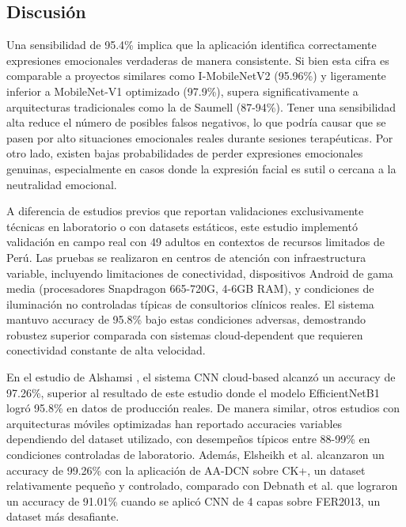 \documentclass[journal,article,submit,pdftex,moreauthors]{Definitions/mdpi}
\begin{document}
	\subsection{Discusión}
	
	Una sensibilidad de 95.4\% implica que la aplicación identifica correctamente expresiones emocionales verdaderas de manera consistente. Si bien esta cifra es comparable a proyectos similares como I-MobileNetV2 \cite{ref3} (95.96\%) y ligeramente inferior a MobileNet-V1 optimizado \cite{ref5} (97.9\%), supera significativamente a arquitecturas tradicionales como la de Saumell \cite{ref2} (87-94\%). Tener una sensibilidad alta reduce el número de posibles falsos negativos, lo que podría causar que se pasen por alto situaciones emocionales reales durante sesiones terapéuticas. Por otro lado, existen bajas probabilidades de perder expresiones emocionales genuinas, especialmente en casos donde la expresión facial es sutil o cercana a la neutralidad emocional.
	
	A diferencia de estudios previos \cite{ref1,ref2,ref3,ref5,ref7,ref8} que reportan validaciones exclusivamente técnicas en laboratorio o con datasets estáticos, este estudio implementó validación en campo real con 49 adultos en contextos de recursos limitados de Perú. Las pruebas se realizaron en centros de atención con infraestructura variable, incluyendo limitaciones de conectividad, dispositivos Android de gama media (procesadores Snapdragon 665-720G, 4-6GB RAM), y condiciones de iluminación no controladas típicas de consultorios clínicos reales. El sistema mantuvo accuracy de 95.8\% bajo estas condiciones adversas, demostrando robustez superior comparada con sistemas cloud-dependent \cite{ref1} que requieren conectividad constante de alta velocidad.
	
	En el estudio de Alshamsi \cite{ref1}, el sistema CNN cloud-based alcanzó un accuracy de 97.26\%, superior al resultado de este estudio donde el modelo EfficientNetB1 logró 95.8\% en datos de producción reales. De manera similar, otros estudios con arquitecturas móviles optimizadas han reportado accuracies variables dependiendo del dataset utilizado, con desempeños típicos entre 88-99\% en condiciones controladas de laboratorio. Además, Elsheikh et al. \cite{ref8} alcanzaron un accuracy de 99.26\% con la aplicación de AA-DCN sobre CK+, un dataset relativamente pequeño y controlado, comparado con Debnath et al. \cite{ref9} que lograron un accuracy de 91.01\% cuando se aplicó CNN de 4 capas sobre FER2013, un dataset más desafiante.
	
\end{document}
